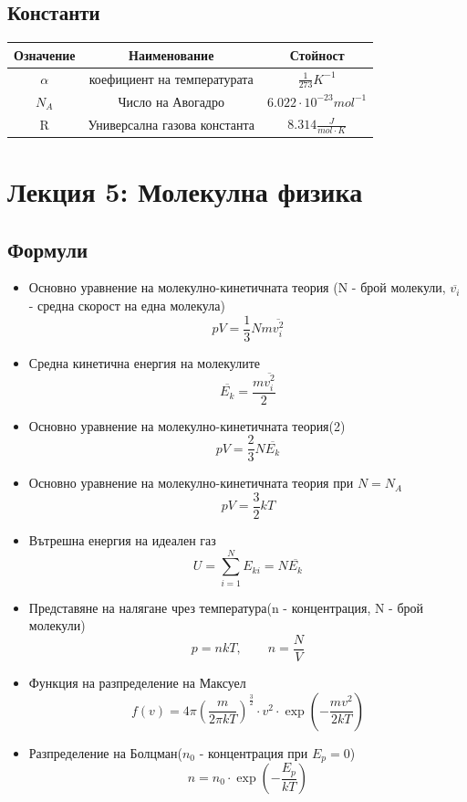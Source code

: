 \documentclass[fleqn, 12pt]{article}
\theoremstyle{definition}
\begin{document}
\newpage
\subsection{Константи}

\begin{center}
\begin{tabular}{ |c|c|c|}
\hline
\textbf{Означение} & \textbf{Наименование}&\textbf{Стойност}\\
\hline
$\alpha$ & коефициент на температурата & $\frac{1}{273} K^{-1}$\\
\hline
$N_A$ & Число на Авогадро & $6.022 \cdot 10^{-23} mol^{-1}$\\
\hline
R & Универсална газова константа & $8.314 \frac{J}{mol \cdot K}$\\
\hline
\end{tabular}
\end{center}

\newpage
\section{Лекция 5: Молекулна физика}

\subsection{Формули}
\begin{itemize}
\item Основно уравнение на молекулно-кинетичната теория (N - брой молекули, $\overline{v_i}$ - средна скорост на една молекула)
$$pV = \frac{1}{3} Nm \overline{v_i ^2}$$
\item Средна кинетична енергия на молекулите
$$\overline{E_k} = \frac{m \overline{v_i ^2}}{2}$$
\item Основно уравнение на молекулно-кинетичната теория(2)
$$pV = \frac{2}{3} N\overline{E_k}$$
\item Основно уравнение на молекулно-кинетичната теория при $N = N_A$
$$pV = \frac{3}{2} k T$$
\item Вътрешна енергия на идеален газ
$$U = \sum_{i=1} ^N E_{ki} = N \overline{E_k}$$
\item Представяне на налягане чрез температура(n - концентрация, N - брой молекули)
$$p = nkT, \qquad n = \frac{N}{V}$$
\item Функция на разпределение на Максуел
$$f(v) = 4 \pi \left( \frac{m}{2 \pi k T}\right)^{\frac{3}{2}} \cdot v^2 \cdot \exp \left(- \frac{m v^2}{2 k T} \right)$$
\item Разпределение на Болцман($n_0$ - концентрация при $E_p = 0$)
$$n = n_0 \cdot \exp \left( - \frac{E_p}{kT}\right)$$
\end{itemize}
\end{document}
